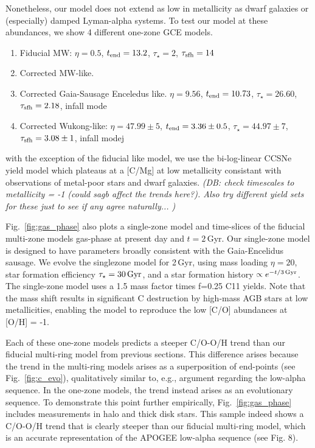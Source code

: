 \documentclass[fleqn,
usenatbib]{mnras}
\makeatletter
\DeclareRobustCommand\citepos
  {\begingroup
   \let\NAT@nmfmt\NAT@posfmt%
   \NAT@swafalse\let\NAT@ctype\z@\NAT@partrue
   \@ifstar{\NAT@fulltrue\NAT@citetp}{\NAT@fullfalse\NAT@citetp}}
\let\NAT@orig@nmfmt\NAT@nmfmt
\def\NAT@posfmt#1{\NAT@orig@nmfmt{#1's}}
\newcommand{\dbnote}[1]{ {\color{Thistle} \textit{\small (DB: #1)}} }
\makeatother
\begin{document}
Nonetheless, our model does not extend as low in metallicity as dwarf galaxies
or (especially) damped Lyman-alpha systems.
To test our model at these abundances, we show 4 different one-zone GCE models.
\begin{enumerate}
    \item Fiducial MW: $\eta=0.5$, $t_{\rm end} = 13.2$, $\tau_\star=2$, $\tau_{\rm sfh} = 14$
    \item Corrected MW-like. 
    \item Corrected Gaia-Sausage Enceledus like. $\eta=9.56$, $t_{\rm end}=10.73$, $\tau_\star = 26.60$, $\tau_{\rm sfh} = 2.18$, infall mode
    \item Corrected Wukong-like: $\eta=47.99\pm 5$, $t_{\rm end} = 3.36\pm 0.5$, $\tau_\star=44.97\pm 7$, $\tau_{\rm sfh} = 3.08\pm 1$, infall modej
\end{enumerate}
with the exception of the fiducial like model, we use the bi-log-linear CCSNe yield model which plateaus at a [C/Mg] at low metallicity consistant with observations of metal-poor stars and dwarf galaxies.
\dbnote{check timescales to metallicity = -1 (could sagb affect the trends here?). Also try different yield sets for these just to see if any agree naturally... }

Fig.~\ref{fig:gas_phase} also plots a single-zone model and time-slices of the fiducial multi-zone models gas-phase at present day and $t=2$\,Gyr. 
Our single-zone model is designed to have parameters broadly consistent with the Gaia-Encelidus sausage.
We evolve the singlezone model for 2\,Gyr, using mass loading $\eta=20$, star formation efficiency $\tau_{\star}=30\,{\rm Gyr}$, and a star formation history $\propto e^{-t/3{\rm\,Gyr}}$.
The single-zone model uses a 1.5 mass factor times f=0.25 C11 yields. Note that the mass shift results in significant C destruction by high-mass AGB stars at low metallicities, enabling the model to reproduce the low [C/O] abundances at [O/H] = -1.


Each of these one-zone models predicts a steeper C/O-O/H trend than our
fiducial multi-ring model from previous sections.
This difference arises because the trend in the multi-ring models arises as a
superposition of end-points (see Fig.~\ref{fig:c_evo}), qualitatively similar to, e.g.,
\citepos{schonrich-binney09} argument regarding
the low-alpha sequence.
In the one-zone models, the trend instead arises as an evolutionary sequence.
To demonstrate this point further empirically, Fig.~\ref{fig:gas_phase} includes measurements
in halo and thick disk stars.
This sample indeed shows a C/O-O/H trend that is clearly steeper than our
fiducial multi-ring model, which is an accurate representation of the APOGEE
low-alpha sequence (see Fig. 8).
\end{document}
